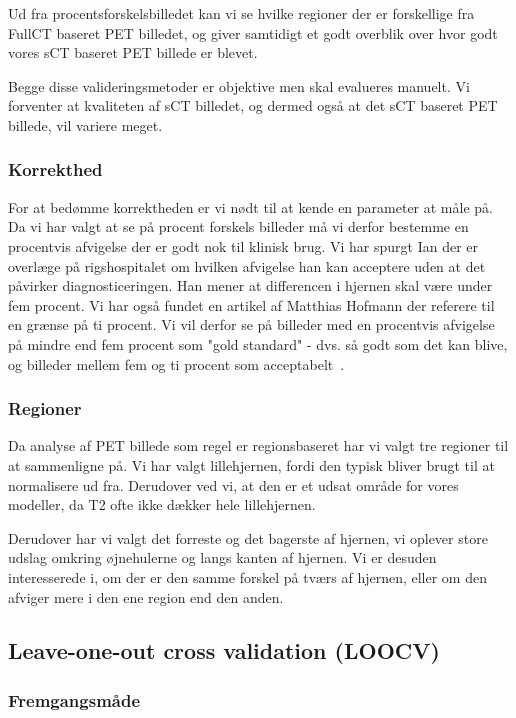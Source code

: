 Ud fra procentsforskelsbilledet kan vi se hvilke regioner der er forskellige fra FullCT baseret PET billedet, og giver samtidigt et godt overblik over hvor godt vores sCT baseret PET billede er blevet.

Begge disse valideringsmetoder er objektive men skal evalueres manuelt. Vi forventer at kvaliteten af sCT billedet, og dermed også at det sCT baseret PET billede, vil variere meget.

\subsubsection{Korrekthed}

For at bedømme korrektheden er vi nødt til at kende en parameter at
måle på. Da vi har valgt at se på procent forskels billeder må vi
derfor bestemme en procentvis afvigelse der er godt nok til klinisk brug.
Vi har spurgt Ian der er overlæge på rigshospitalet om hvilken afvigelse
han kan acceptere uden at det påvirker diagnosticeringen. Han mener at
differencen i hjernen skal være under fem procent. Vi har også fundet en
artikel af Matthias Hofmann der referere til en grænse på ti procent. Vi
vil derfor se på billeder med en procentvis afvigelse på mindre end fem
procent som "gold standard" - dvs. så godt som det kan blive, og billeder
mellem fem og ti procent som acceptabelt~\cite{accepteretAfvigelse}.

\subsubsection{Regioner}


Da analyse af PET billede som regel er regionsbaseret har vi valgt tre
regioner til at sammenligne på. Vi har valgt lillehjernen, fordi den
typisk bliver brugt til at normalisere ud fra. Derudover ved vi, at den er
et udsat område for vores modeller, da T2 ofte ikke dækker hele
lillehjernen. 

Derudover har vi valgt det forreste og det bagerste af hjernen, vi
oplever store udslag omkring øjnehulerne og langs kanten af hjernen. Vi
er desuden interesserede i, om der er den samme forskel på tværs af
hjernen, eller om den afviger mere i den ene region end den anden.

\subsection{Leave-one-out cross validation (LOOCV)}
\subsubsection{Fremgangsmåde}

